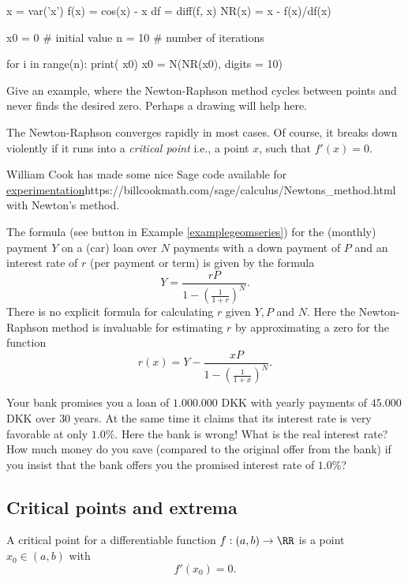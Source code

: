 \documentclass{article}
\begin{document}
\begin{sage}
x = var('x')
f(x) = cos(x) - x
df = diff(f, x)
NR(x) = x - f(x)/df(x)

x0 = 0 # initial value
n = 10 # number of iterations

for i in range(n):
  print( x0)
  x0 = N(NR(x0), digits = 10)
\end{sage}



\beginshex
Give an example, where the Newton-Raphson method cycles between points
and never finds the desired zero. Perhaps a drawing will help here.
\endshex

The Newton-Raphson converges rapidly in most cases. Of course, it
breaks down violently if it runs into a \emph{critical point} i.e.,
a point $x$, such that $f'(x) = 0$.

William Cook has made some nice Sage code available for
\url{experimentation}{https://billcookmath.com/sage/calculus/Newtons_method.html} with Newton's method.

\begin{example}
  The formula (see button in Example \ref{examplegeomseries})
  for the (monthly) payment $Y$ on a (car) loan over $N$ payments with
  a down payment of $P$ and an interest rate of $r$ (per payment or term) is given by the formula
    $$
    Y = \frac{r P}{1 - \left(\frac{1}{1+r}\right)^N}.
    $$
    There is no explicit formula for calculating $r$ given $Y, P$ and $N$. Here
    the Newton-Raphson method is invaluable for estimating $r$ by approximating a
    zero for the function
    $$
    r(x) = Y - \frac{x P}{1 - \left(\frac{1}{1+x}\right)^N}.
    $$
\end{example}

\beginshex
Your bank promises you a loan of $1.000.000$ DKK with yearly payments
of $45.000$ DKK over $30$ years. At the same time it claims that
its interest rate is very favorable at only $1.0$\%. Here the bank is
wrong! What is the
real interest rate?
How much money do you save (compared to the original offer from the bank) if you insist that the bank offers you
the promised interest rate of $1.0$\%?
\endshex




\subsection{Critical points and extrema}

\begin{definition}[emph]
  A critical point for a differentiable function $f:(a, b)\rightarrow \RR$ is
  a point $x_0\in (a, b)$ with
  $$
  f'(x_0) = 0.
  $$
\end{definition}
\end{document}
